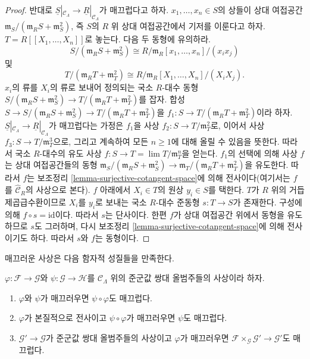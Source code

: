 \begin{proof}
\medskip\noindent
반대로
$\underline{S}|_{\mathcal{C}_\Lambda} \to \underline{R}|_{\mathcal{C}_\Lambda}$가
매끄럽다고 하자. $x_1, \ldots, x_n \in S$의 상들이 상대 여접공간
$\mathfrak m_S/(\mathfrak m_R S + \mathfrak m_S^2)$, 즉 $S$의 $R$ 위
상대 여접공간에서 기저를 이룬다고 하자.
$T = R[[X_1, \ldots, X_n]]$로 놓는다. 다음 두 동형에 유의하라.
$$
S/(\mathfrak m_R S + \mathfrak m_S^2) \cong
R/\mathfrak m_R[x_1, \ldots, x_n]/(x_ix_j)
$$
및
$$
T/(\mathfrak m_R T + \mathfrak m_T^2) \cong
R/\mathfrak m_R[X_1, \ldots, X_n]/(X_iX_j).
$$
$x_i$의 류를 $X_i$의 류로 보내어 정의되는 국소 $R$-대수 동형
$S/(\mathfrak m_R S + \mathfrak m_S^2) \to
T/(\mathfrak m_R T + \mathfrak m_T^2)$를 잡자. 합성
$S \to S/(\mathfrak m_R S + \mathfrak m_S^2)
\to T/(\mathfrak m_R T + \mathfrak m_T^2)$을
$f_1 : S \to T/(\mathfrak m_R T + \mathfrak m_T^2)$이라 하자.
$\underline{S}|_{\mathcal{C}_\Lambda} \to \underline{R}|_{\mathcal{C}_\Lambda}$가
매끄럽다는 가정은 $f_1$을 사상
$f_2 : S \to T/\mathfrak{m}_T^2$로, 이어서 사상
$f_3 : S \to T/\mathfrak{m}_T^3$으로, 그리고 계속하여 모든
$n \geq 1$에 대해 올릴 수 있음을 뜻한다. 따라서 국소 $R$-대수의
유도 사상 $f : S \to T = \lim T/\mathfrak m_T^n$을 얻는다.
$f_1$의 선택에 의해 사상 $f$는 상대 여접공간들의 동형
$\mathfrak m_S/(\mathfrak m_R S + \mathfrak m_S^2) \to
\mathfrak m_T/(\mathfrak m_R T + \mathfrak m_T^2)$을 유도한다.
따라서 $f$는 보조정리 \ref{lemma-surjective-cotangent-space}에 의해
전사이다(여기서는 $f$를 $\widehat{\mathcal{C}}_R$의 사상으로 본다).
$f$ 아래에서 $X_i \in T$의 원상 $y_i \in S$를 택한다.
$T$가 $R$ 위의 거듭제곱급수환이므로 $X_i$를 $y_i$로 보내는 국소
$R$-대수 준동형 $s : T \to S$가 존재한다. 구성에 의해
$f \circ s = \text{id}$이다. 따라서 $s$는 단사이다. 한편 $f$가
상대 여접공간 위에서 동형을 유도하므로 $s$도 그러하며, 다시 보조정리
\ref{lemma-surjective-cotangent-space}에 의해 전사이기도 하다.
따라서 $s$와 $f$는 동형이다.
\end{proof}

\noindent
매끄러운 사상은 다음 함자적 성질들을 만족한다.

\begin{lemma}
\label{lemma-smooth-properties}
$\varphi : \mathcal{F} \to \mathcal{G}$와 $\psi : \mathcal{G}
\to \mathcal{H}$를 $\mathcal{C}_\Lambda$ 위의 준군값 쌍대
올범주들의 사상이라 하자.
\begin{enumerate}
\item $\varphi$와 $\psi$가 매끄러우면 $\psi \circ \varphi$도 매끄럽다.
\item $\varphi$가 본질적으로 전사이고 $\psi \circ \varphi$가
매끄러우면 $\psi$도 매끄럽다.
\item $\mathcal{G}' \to \mathcal{G}$가 준군값 쌍대 올범주들의
사상이고 $\varphi$가 매끄러우면
$\mathcal{F} \times_\mathcal{G} \mathcal{G}' \to \mathcal{G}'$도
매끄럽다.
\end{enumerate}
\end{lemma}

